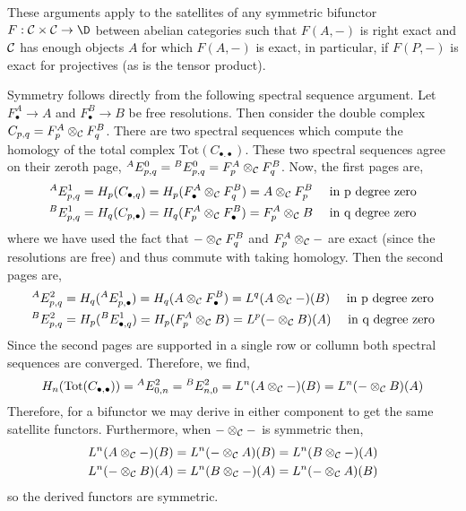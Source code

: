 \documentclass[12pt]{article}
\begin{document}
\begin{remark}
These arguments apply to the satellites of any symmetric bifunctor $F : \C \times \C \to \D$ between abelian categories such that $F(A, -)$ is right exact and $\mathcal{C}$ has enough objects $A$ for which $F(A, -)$ is exact, in particular, if $F(P, -)$ is exact for projectives (as is the tensor product). 
\end{remark}

\newcommand{\Tot}{\mathrm{Tot}}

\begin{remark}
Symmetry follows directly from the following spectral sequence argument. Let $F^A_\bullet \to A$ and $F^B_\bullet \to B$ be free resolutions. Then consider the double complex $C_{p,q} = F^A_p \otimes_{\mathcal{C}} F^B_q$. There are two spectral sequences which compute the homology of the total complex $\Tot(C_{\bullet. \bullet})$. These two spectral sequences agree on their zeroth page, ${}^A E^0_{p,q} = {}^B E^0_{p,q} = F^A_p \otimes_{\mathcal{C}} F^B_q$. Now, the first pages are,
\begin{align*}
{}^A E^1_{p,q} & = H_{p}(C_{\bullet, q}) = H_{p}(F^A_\bullet \otimes_{\mathcal{C}} F^B_q) = A \otimes_{\mathcal{C}} F_p^B \quad \text{ in p degree zero}
\\
{}^B E^1_{p,q} & = H_{q}(C_{p, \bullet}) = H_{q}(F^A_p \otimes_{\mathcal{C}} F^B_\bullet) = F^A_p \otimes_{\mathcal{C}} B \quad \text{ in q degree zero}
\end{align*}
where we have used the fact that $- \otimes_{\mathcal{C}} F^B_q$ and $F^A_p \otimes_{\mathcal{C}} - $ are exact (since the resolutions are free) and thus commute with taking homology. Then the second pages are,
\begin{align*}
{}^A E^2_{p,q} & = H_{q}({}^A E^1_{p, \bullet}) = H_{q}(A \otimes_{\mathcal{C}} F_\bullet^B) = L^q(A \otimes_{\mathcal{C}} -)(B) \quad \text{ in p degree zero}
\\
{}^B E^2_{p,q} & = H_{p}({}^B E^1_{\bullet, q}) = H_{p}(F^A_p \otimes_{\mathcal{C}} B) = L^p (- \otimes_{\mathcal{C}} B)(A) \quad \text{ in q degree zero}
\end{align*}
Since the second pages are supported in a single row or collumn both spectral sequences are converged. Therefore, we find,
\[ H_n(\Tot(C_{\bullet, \bullet})) = {}^A E^2_{0,n} = {}^B E^2_{n, 0} = L^n(A \otimes_\C -)(B) = L^n(- \otimes_\C B)(A) \] 
Therefore, for a bifunctor we may derive in either component to get the same satellite functors. Furthermore, when $- \otimes_{\mathcal{C}} -$ is symmetric then, 
\begin{align*}
L^n(A \otimes_{\mathcal{C}} -)(B) & = L^n(- \otimes_{\mathcal{C}} A)(B) = L^n(B \otimes_{\mathcal{C}} -)(A) 
\\
L^n(- \otimes_{\mathcal{C}} B)(A) & = L^n(B \otimes_{\mathcal{C}} -)(A) = L^n(- \otimes_{\mathcal{C}} A)(B) 
\end{align*}
so the derived functors are symmetric.
\end{remark}
\end{document}
